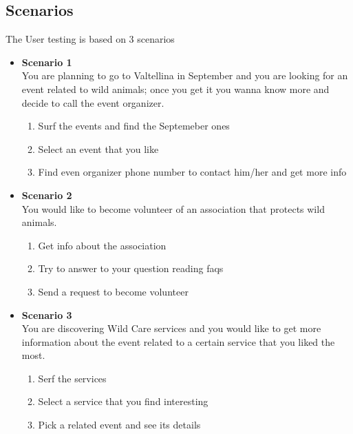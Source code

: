 \subsection{Scenarios}
The User testing is based on 3 scenarios
\begin{itemize}
		\item \textbf{Scenario 1}\\ You are planning to go to Valtellina in September and you are looking for an event related to 				wild animals; once you get it you wanna know more and decide to call the event organizer.
			\begin{enumerate}
				\item Surf the events and find the Septemeber ones
				\item Select an event that you like
				\item Find even organizer phone number to contact him/her and get more info
			\end{enumerate}
		\item \textbf{Scenario 2}\\ You would like to become volunteer of an association that protects wild animals.
			\begin{enumerate}
				\item Get info about the association
				\item Try to answer to your question reading faqs
				\item Send a request to become volunteer
			\end{enumerate}
		\item \textbf{Scenario 3}\\ You are discovering Wild Care services and you would like to get more information about the 			event related to a certain service that you liked the most.
			\begin{enumerate}
				\item Serf the services
				\item Select a service that you find interesting 
				\item Pick a related event and see its details
			\end{enumerate}
\end{itemize}

